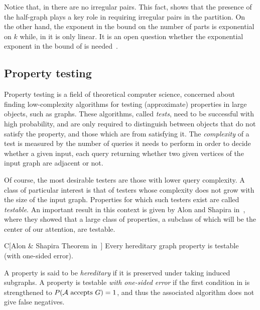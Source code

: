         Notice that, in  there are no irregular pairs.
        This fact, shows that the presence of the half-graph plays a key role in requiring irregular pairs in the partition.
        On the other hand, the exponent in the bound on the number of parts is exponential on $k$ while,
        in  it is only linear.
        It is an open question whether the exponential exponent in the bound of  is
        needed~\cite{julia_wolf_private_comunication}.

    \subsection{Property testing} \label{subsec:subsection_1.3}

        Property testing is a field of theoretical computer science, concerned about finding low-complexity algorithms
        for testing (approximate) properties in large objects, such as graphs.
        These algorithms, called \emph{tests}, need to be successful with high probability, and are only required to distinguish between objects
        that do not satisfy the property, and those which are  from satisfying it.
        The \emph{complexity} of a test is measured by the number of queries it needs to perform in order to decide
        whether a given input, each query returning whether two given vertices of the input graph are adjacent or not.

        Of course, the most desirable testers are those with lower query complexity.
        A class of particular interest is that of testers whose complexity does not grow with the size of the input
        graph.
        Properties for which such testers exist are called \emph{testable}.
        An important result in this context is given by Alon and Shapira
        in~\cite{a_characterization_of_the_natural_graph_properties_testable_with_one_sided_error}, where they
        showed that a large class of properties, a subclass of which will be the center of our attention, are testable.

        \begin{thm*}{C}[Alon \& Shapira Theorem in~\cite{a_characterization_of_the_natural_graph_properties_testable_with_one_sided_error}]
            \label{thm:alon_and_shapira_theorem}
            Every hereditary graph property is testable (with one-sided error).
        \end{thm*}

        A property is said to be \emph{hereditary} if it is preserved under taking induced subgraphs.
        A property is testable \emph{with one-sided error} if the first condition in 
        is strengthened to $P( \mathcal{A} \text{ accepts } G ) = 1$, and thus the associated algorithm does
        not give false negatives.

